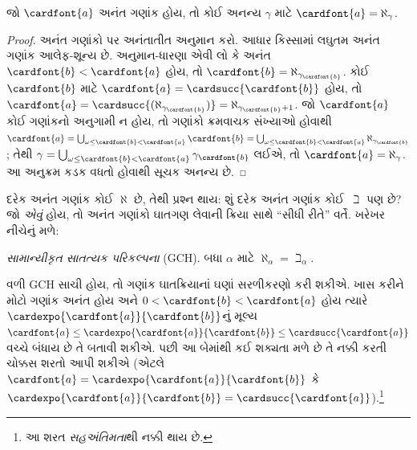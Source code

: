 \begin{prop}
જો $\cardfont{a}$ અનંત ગણાંક હોય, તો કોઈ અનન્ય
$\gamma$ માટે $\cardfont{a} = \aleph_\gamma$.
\end{prop}

\begin{proof}
અનંત ગણાંકો પર અનંતાતીત અનુમાન કરો. આધાર
કિસ્સામાં લઘુતમ અનંત ગણાંક આલેફ-શૂન્ય છે.
અનુમાન-ધારણા એવી લો કે અનંત
$\cardfont{b} < \cardfont{a}$ હોય,
તો $\cardfont{b} = \aleph_{\gamma_\cardfont{b}}$.
કોઈ $\cardfont{b}$ માટે
$\cardfont{a} = \cardsucc{\cardfont{b}}$ હોય, તો
$\cardfont{a} = \cardsucc{(\aleph_{\gamma_\cardfont{b}})}=
\aleph_{\gamma_\cardfont{b}+1}$. જો $\cardfont{a}$
કોઈ ગણાંકનો અનુગામી ન હોય, તો ગણાંકો ક્રમવાચક
સંખ્યાઓ હોવાથી
$\cardfont{a} = \bigcup_{\omega \leq \cardfont{b} < \cardfont{a}} \cardfont{b} =
\bigcup_{\omega \leq \cardfont{b} < \cardfont{a}}{\aleph_{\gamma_\cardfont{b}}}$;
તેથી $\gamma = \bigcup_{\omega \leq \cardfont{b} <
\cardfont{a}}\gamma_\cardfont{b}$ લઈએ, તો
$\cardfont{a} = \aleph_\gamma$. આ અનુક્રમ કડક
વધતો હોવાથી સૂચક અનન્ય છે.
\end{proof}

દરેક અનંત ગણાંક કોઈ $\aleph$ છે, તેથી પ્રશ્ન થાય:
શું દરેક અનંત ગણાંક કોઈ~$\beth$ પણ છે? જો
\emph{એવું} હોય, તો અનંત ગણાંકો ઘાતગણ લેવાની
ક્રિયા સાથે ``સીધી રીતે'' વર્તે. ખરેખર નીચેનું
મળે:

\begin{defish}
\emph{સામાન્યીકૃત સાતત્યક પરિકલ્પના} (GCH).
બધા $\alpha$ માટે $\aleph_\alpha  = \beth_\alpha$.
\end{defish}

વળી GCH સાચી હોય, તો ગણાંક ઘાતક્રિયાનાં ઘણાં
સરળીકરણો કરી શકીએ. ખાસ કરીને મોટો ગણાંક અનંત
હોય અને
$0<\cardfont{b} < \cardfont{a}$ હોય ત્યારે
$\cardexpo{\cardfont{a}}{\cardfont{b}}$નું મૂલ્ય
$\cardfont{a}\leq \cardexpo{\cardfont{a}}{\cardfont{b}} \leq
\cardsucc{\cardfont{a}}$ વચ્ચે બંધાય છે તે
બતાવી શકીએ. પછી આ બેમાંથી કઈ શક્યતા મળે છે
તે નક્કી કરતી ચોક્કસ શરતો આપી શકીએ
(એટલે $\cardfont{a} =
\cardexpo{\cardfont{a}}{\cardfont{b}}$ કે
$\cardexpo{\cardfont{a}}{\cardfont{b}} =
\cardsucc{\cardfont{a}}$).\footnote{આ શરત
\emph{સહઅંતિમતા}થી નક્કી થાય છે.}

